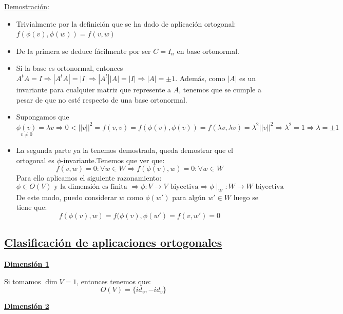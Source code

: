 \documentclass[10pt,a4paper,openright]{book}
\begin{document}
\underline{Demostración}:
\begin{itemize}
\item Trivialmente por la definición que se ha dado de aplicación ortogonal: $f(\phi(v),\phi(w)) = f(v,w)$
\item De la primera se deduce fácilmente por ser $C=I_n$ en base ortonormal.
\item Si la base es ortonormal, entonces $A^tA = I\Rightarrow |A^tA| = |I|\Rightarrow |A^t||A| = |I|\Rightarrow |A| = \pm 1$. Además, como $|A|$ es un invariante para cualquier matriz que represente a $A$, tenemos que se cumple a pesar de que no esté respecto de una base ortonormal.
\item Supongamos que $\underset{v \neq 0}{\phi(v)} = \lambda v \Rightarrow 0<||v||^2 = f(v,v)  = f(\phi(v),\phi(v)) = f(\lambda v, \lambda v) = \lambda ^2 ||v||^2 \Rightarrow \lambda^2 = 1 \Rightarrow \lambda = \pm 1$
\item La segunda parte ya la tenemos demostrada, queda demostrar que el ortogonal es $\phi$-invariante.Tenemos que ver que:
$$f(v,w) = 0 : \forall w \in W \Rightarrow f(\phi(v), w) = 0: \forall w \in W$$
Para ello aplicamos el siguiente razonamiento:
$$\phi \in O(V) \mbox{ y la dimensión es finita }\Rightarrow \phi:V\to V \mbox{ biyectiva} \Rightarrow \phi \mid_W: W\to W \mbox{ biyectiva}$$
De este modo, puedo considerar $w$ como $\phi(w')$ para algún $w'\in W$ luego se tiene que:
$$f(\phi(v), w) = f(\phi(v),\phi(w') = f(v,w') = 0$$
\end{itemize}

\subsection*{\underline{Clasificación de aplicaciones ortogonales}}
\underline{\textbf{Dimensión 1}}

Si tomamos $\dim V = 1$, entonces tenemos que:
$$O(V) = \{id_v, -id_v\}$$

\underline{\textbf{Dimensión 2}}
\end{document}
